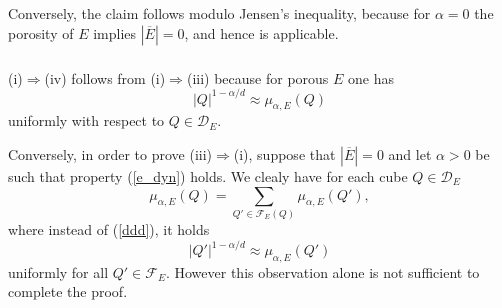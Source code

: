 \documentclass[12pt]{amsart} \setlength{\textwidth}{15cm} \setlength{\textheight}{24cm} \setlength{\voffset}{-1cm} \setlength{\oddsidemargin}{-0.4cm} \setlength{\evensidemargin}{-0.4cm}
\theoremstyle{definition}
\theoremstyle{remark}
\begin{document}
Conversely,   the claim   follows modulo
 Jensen's inequality, because  for $ \alpha =0 $  the porosity of $E$ implies $|\overline{E}|=0$, and hence \cite[Theorem 7]{V} is applicable.


\subsubsection{}
(i)$\Rightarrow$(iv) follows from (i)$\Rightarrow$(iii) because for porous $E$ one has 
 \begin{equation}\label{ddd}
       |Q|^{1-\alpha /d}\approx \mu_{\alpha,E}(Q) 
     \end{equation}
uniformly with respect to $ Q \in \mathcal{D}_E$.










Conversely, in order  to prove  (iii)$\Rightarrow$(i),  suppose that  $|\overline{E}|=0$ and let
 $ \alpha >0 $ be such that  property   (\ref{e_dyn}) holds.
We clealy have   for each cube $Q \in \mathcal{D}_E$
 \begin{equation}\label{ccc}
  \mu_{\alpha,E}(Q) = \sum _ {Q' \in \mathcal{F}_E(Q)}\mu_{\alpha,E}(Q'),
\end{equation}
where instead of (\ref{ddd}), it holds
\[|Q'|^{1-\alpha /d}\approx \mu_{\alpha,E}(Q')\] 
 uniformly for all $ Q' \in \mathcal{F}_E$. However this observation alone is not sufficient to complete the proof.
\end{document}

